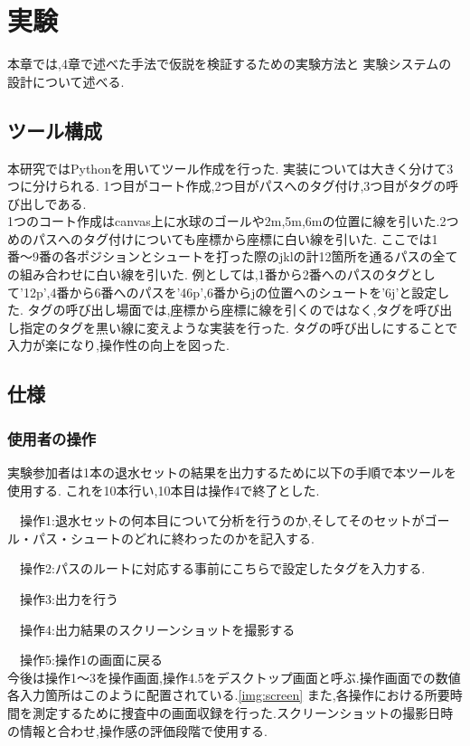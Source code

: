 \documentclass[../main.tex]{subfiles}
\begin{document}
\chapter{実験}


本章では,4章で述べた手法で仮説を検証するための実験方法と
実験システムの設計について述べる.


\section{ツール構成}
本研究ではPythonを用いてツール作成を行った.
実装については大きく分けて3つに分けられる.
1つ目がコート作成,2つ目がパスへのタグ付け,3つ目がタグの呼び出しである.\\
1つのコート作成はcanvas上に水球のゴールや2m,5m,6mの位置に線を引いた.2つめのパスへのタグ付けについても座標から座標に白い線を引いた.
ここでは1番〜9番の各ポジションとシュートを打った際のjklの計12箇所を通るパスの全ての組み合わせに白い線を引いた.
例としては,1番から2番へのパスのタグとして'12p',4番から6番へのパスを'46p',6番からjの位置へのシュートを'6j'と設定した.
タグの呼び出し場面では,座標から座標に線を引くのではなく,タグを呼び出し指定のタグを黒い線に変えような実装を行った.
タグの呼び出しにすることで入力が楽になり,操作性の向上を図った.


\section{仕様}
\subsection{使用者の操作}
実験参加者は1本の退水セットの結果を出力するために以下の手順で本ツールを使用する.
これを10本行い,10本目は操作4で終了とした.
\par　操作1:退水セットの何本目について分析を行うのか,そしてそのセットがゴール・パス・シュートのどれに終わったのかを記入する.
\par　操作2:パスのルートに対応する事前にこちらで設定したタグを入力する.
\par　操作3:出力を行う
\par　操作4:出力結果のスクリーンショットを撮影する
\par　操作5:操作1の画面に戻る\\
今後は操作1〜3を操作画面,操作4.5をデスクトップ画面と呼ぶ.操作画面での数値各入力箇所はこのように配置されている.\ref{img:screen}
また,各操作における所要時間を測定するために捜査中の画面収録を行った.スクリーンショットの撮影日時の情報と合わせ,操作感の評価段階で使用する.
\end{document}
